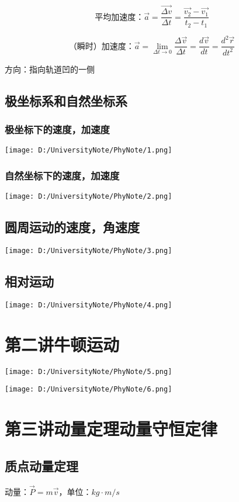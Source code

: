 \documentclass[UTF8]{article}
\begin{document}
    \[\mbox{平均加速度：}\vec{a} = \frac{\vec{\Delta v}}{\Delta t} = \frac{\vec{v_2} - \vec{v_1}}{t_2 - t_1}\]

    \[\mbox{（瞬时）加速度：}\vec{a} = \lim_{\Delta t \rightarrow 0}\frac{\Delta \vec{v}}{\Delta t} = \frac{d\vec{v}}{dt} = \frac{d^2\vec{r}}{dt^2}\]

    \;\;方向：指向轨道凹的一侧

\subsection{极坐标系和自然坐标系}
\subsubsection{极坐标下的速度，加速度}
\texttt{[image: D:/UniversityNote/PhyNote/1.png]}
\subsubsection{自然坐标下的速度，加速度}
\texttt{[image: D:/UniversityNote/PhyNote/2.png]}
\subsection{圆周运动的速度，角速度}
\texttt{[image: D:/UniversityNote/PhyNote/3.png]}
\subsection{相对运动}
\texttt{[image: D:/UniversityNote/PhyNote/4.png]}
\newpage
\section{第二讲\;\;牛顿运动}
\texttt{[image: D:/UniversityNote/PhyNote/5.png]}

\texttt{[image: D:/UniversityNote/PhyNote/6.png]}
\newpage
\section{第三讲\;\;动量定理\;\;动量守恒定律}
\subsection{质点动量定理}

    动量：$\vec{P} = m\vec{v}$，单位：$kg\cdot m/s$
    
\end{document}
